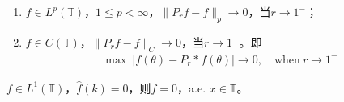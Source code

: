 \begin{theorem}
    \begin{enumerate}[leftmargin=1cm, label=\arabic*]
        \item $f\in L^p(\mathbb{T})$，$1\leqslant p < \infty$，$\| P_r f -f\|_p \to 0$，当$r\to 1^{-}$；
        \item $f\in C(\mathbb{T})$，$\|P_r f - f\|_{C} \to 0$，当$r\to 1^{-}$。即
        \begin{align*}
            \max\ \left|f(\theta) - P_r * f(\theta)\right| \to 0,\quad \text{when}\ r\to 1^-
        \end{align*}
    \end{enumerate}
\end{theorem}


\begin{Corollary}
    $f\in L^1(\mathbb{T})$，$\hat{f}(k) = 0$，则$f=0$，a.e. $x\in\mathbb{T}$。
\end{Corollary}


